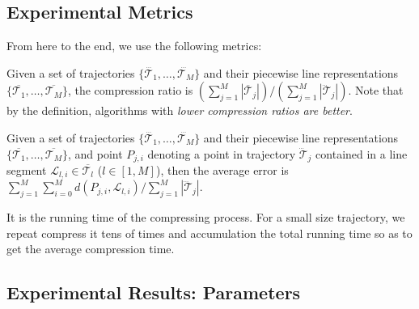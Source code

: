 \subsection{Experimental Metrics}

From here to the end, we use the following metrics:

 Given a set of trajectories $\{\dddot{\mathcal{T}_1}, \ldots, \dddot{\mathcal{T}_M}\}$ and their piecewise line representations
$\{\overline{\mathcal{T}_1}, \ldots, \overline{\mathcal{T}_M}\}$, the compression ratio is $(\sum_{j=1}^{M} |\overline{\mathcal{T}}_j |)/(\sum_{j=1}^{M} |\dddot{\mathcal{T}}_j |)$.
Note that by the definition, algorithms with \emph{lower compression ratios are better}.

 Given a set of trajectories $\{\dddot{\mathcal{T}_1}, \ldots, \dddot{\mathcal{T}_M}\}$ and their piecewise line representations $\{\overline{\mathcal{T}_1}, \ldots, \overline{\mathcal{T}_M}\}$, and point $P_{j,i}$ denoting
a point in trajectory $\dddot{\mathcal{T}}_j$ contained in a line segment $\mathcal{L}_{l,i}\in\overline{\mathcal{T}_l}$ ($l\in[1,M]$),
then the average error is $\sum_{j=1}^{M}\sum_{i=0}^{M} d(P_{j,i},
\mathcal{L}_{l,i})/\sum_{j=1}^{M}{|\dddot{\mathcal{T}}_j |}$.

 It is the running time of the compressing process.
For a small size trajectory, we repeat compress it tens of times and accumulation the total running time so as to get the average compression time.


\subsection{Experimental Results: Parameters}



